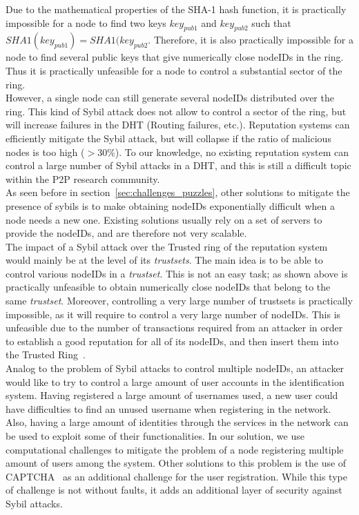 Due to the mathematical properties of the SHA-1 hash function, it is
practically impossible for a node to find two keys $key_{pub1}$ and
$key_{pub2}$ such that $SHA1(key_{pub1}) = SHA1(key_{pub2}$. Therefore, it is
also practically impossible for a node to find several public keys that give
numerically close nodeIDs in the ring. Thus it is practically unfeasible for a
node to control a substantial sector of the ring.\\

However, a single node can still generate several nodeIDs distributed over the
ring. This kind of Sybil attack does not allow to control a sector of the ring,
but will increase failures in the DHT (Routing failures, etc.).  Reputation
systems can efficiently mitigate the Sybil attack, but will collapse if the
ratio of malicious nodes is too high ($> 30\%$). To our knowledge, no existing reputation system can control a large
number of Sybil attacks in a DHT, and this is still a difficult topic within
the P2P research community.\\

As seen before in section~\ref{sec:challenges_puzzles}, other solutions to
mitigate the presence of sybils is to make obtaining nodeIDs
exponentially difficult when a node needs a new
one. Existing solutions usually
rely on a set of servers to provide the nodeIDs, and are therefore not very
scalable.\\

The impact of a Sybil attack over the Trusted ring of the reputation system
would mainly be at the level of its \textit{trustsets}. The main idea is to be
able to control various nodeIDs in a \textit{trustset}. This is not an easy
task; as shown above is practically unfeasible to obtain numerically close
nodeIDs that belong to the same \textit{trustset}. Moreover, controlling a very
large number of trustsets is practically impossible, as it will require to
control a very large number of nodeIDs. This is unfeasible due to the number of
transactions required from an attacker in order to establish a good reputation
for all of its nodeIDs, and then insert them into the Trusted
Ring~\cite{rosas2011corps}.\\

Analog to the problem of Sybil attacks to control multiple nodeIDs, an attacker
would like to try to control a large amount of user accounts in the
identification system. Having registered a large amount of usernames used, a new
user could have difficulties to find an unused username when registering in the
network. Also, having a large amount of identities through the services in the
network can be used to exploit some of their functionalities.
In our solution, we use computational challenges to mitigate the problem of a
node registering multiple amount of users among the system. Other solutions to
this problem is the use of CAPTCHA~\cite{von2003captcha} as an additional
challenge for the user registration. While this type of challenge is not
without faults, it adds an additional layer of security against Sybil attacks.


